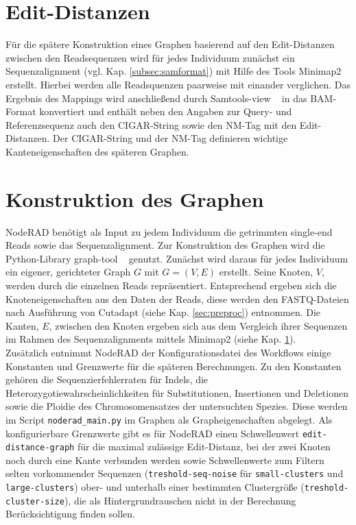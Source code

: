 \section{Edit-Distanzen} \label{sec:edit}

Für die spätere Konstruktion eines Graphen basierend auf den Edit-Distanzen zwischen den Readsequenzen wird für jedes Individuum zunächst ein Sequenzalignment (vgl. Kap. \ref {subsec:samformat}) mit Hilfe des Tools Minimap2 ~\cite{li_2018} erstellt. Hierbei werden alle Readsquenzen paarweise mit einander verglichen. Das Ergebnis des Mappings wird anschließend durch Samtools-view ~\cite{li_2009} in das BAM-Format konvertiert und enthält neben den Angaben zur Query- und Referenzsequenz auch den CIGAR-String sowie den NM-Tag mit den Edit-Distanzen. Der CIGAR-String und der NM-Tag definieren wichtige Kanteneigenschaften des späteren Graphen. \\

\section{Konstruktion des Graphen} \label{sec:graph}

NodeRAD benötigt als Input zu jedem Individuum die getrimmten single-end Reads sowie das Sequenzalignment. Zur Konstruktion des Graphen wird die Python-Library graph-tool ~\cite{peixoto_2014} genutzt. Zunächst wird daraus für jedes Individuum ein eigener, gerichteter Graph $ G $ mit $ G = (V,E) $ erstellt. Seine Knoten, $ V $, werden durch die einzelnen Reads repräsentiert. Entsprechend ergeben sich die Knoteneigenschaften aus den Daten der Reads, diese werden den FASTQ-Dateien nach Ausführung von Cutadapt (siehe Kap. \ref{sec:preproc}) entnommen. Die Kanten, $ E $, zwischen den Knoten ergeben sich aus dem Vergleich ihrer Sequenzen im Rahmen des Sequenzalignments mittels Minimap2 (siehe Kap. \ref{sec:edit}).\\

Zusätzlich entnimmt NodeRAD der Konfigurationsdatei des Workflows einige Konstanten und Grenzwerte für die späteren Berechnungen. Zu den Konstanten gehören die Sequenzierfehlerraten für Indels, die Heterozygotiewahrscheinlichkeiten für Substitutionen, Insertionen und Deletionen sowie die Ploidie des Chromosomensatzes der untersuchten Spezies. Diese werden im Script \lstinline|noderad_main.py| im Graphen als Grapheigenschaften abgelegt. Als konfigurierbare Grenzwerte gibt es für NodeRAD einen Schwellenwert \linebreak \lstinline|edit-distance-graph| für die maximal zulässige Edit-Distanz, bei der zwei Knoten noch durch eine Kante verbunden werden sowie Schwellenwerte zum Filtern selten vorkommender Sequenzen (\lstinline|treshold-seq-noise| für \lstinline|small-clusters| und \lstinline|large-clusters|) ober- und unterhalb einer bestimmten Clustergröße (\lstinline|treshold-cluster-size|), die als Hintergrundrauschen nicht in der Berechnung Berücksichtigung finden sollen. \\

